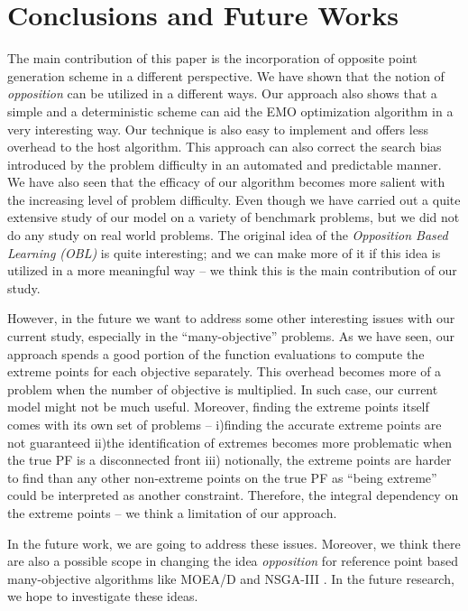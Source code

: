 \documentclass[journal]{IEEEtran}
\begin{document}
\section{Conclusions and Future Works}
\label{sec:conclusion}
The main contribution of this paper is the incorporation of opposite point generation scheme in a different perspective. We have shown that the notion of \textit{opposition} can be utilized in a different ways. Our approach also shows that a simple and a deterministic scheme can aid the EMO optimization algorithm in a very interesting way. Our technique is also easy to implement and offers less overhead to the host algorithm. This approach can also correct the search bias introduced by the problem difficulty in an automated and predictable manner. We have also seen that the efficacy of our algorithm becomes more salient with the increasing level of problem difficulty. Even though we have carried out a quite extensive study of our model on a variety of benchmark problems, but we did not do any study on real world problems. The original idea of the \textit{Opposition Based Learning (OBL)} is quite interesting; and we can make more of it if this idea is utilized in a more meaningful way -- we think this is the main contribution of our study.  

However, in the future we want to address some other interesting issues with our current study, especially in the ``many-objective'' problems. As we have seen, our approach spends a good portion of the function evaluations to compute the extreme points for each objective separately. This overhead becomes more of a problem when the number of objective is multiplied. In such case, our current model might not be much useful. Moreover, finding the extreme points itself comes with its own set of problems -- i)finding the accurate extreme points are not guaranteed ii)the identification of extremes becomes more problematic when the true PF is a disconnected front iii) notionally, the extreme points are harder to find than any other non-extreme points on the true PF as ``being extreme'' could be interpreted as another constraint. Therefore, the integral dependency on the extreme points -- we think a limitation of our approach.

In the future work, we are going to address these issues. Moreover, we think there are also a possible scope in changing the idea \textit{opposition} for reference point based many-objective algorithms like MOEA/D and NSGA-III \cite{nsga3-main-p1}\cite{nsga3-main-p2}. In the future research, we hope to investigate these ideas. 
\end{document}
